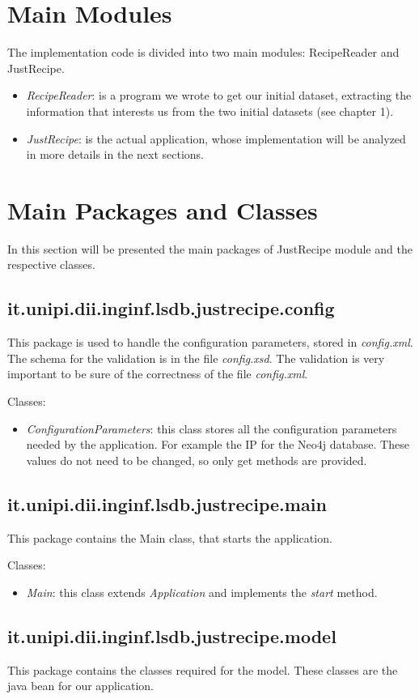 \documentclass[a4paper]{report}
\begin{document}
\section{Main Modules}
The implementation code is divided into two main modules: RecipeReader and JustRecipe.
 \begin{itemize}
	\item \emph{RecipeReader}:  is a program we wrote to get our initial dataset, extracting the information that interests us from the two initial datasets (see chapter 1). 
	\item \emph{JustRecipe}:  is the actual application, whose implementation will be analyzed in more details in the next sections. 
\end{itemize}
\section{Main Packages and Classes}
In this section will be presented the main packages of JustRecipe module and the respective classes.
\subsection {it.unipi.dii.inginf.lsdb.justrecipe.config}
This package is used to handle the configuration parameters, stored in \emph{config.xml}. The schema for the validation is in the file \emph{config.xsd}. The validation is very important to be sure of the correctness of the file \emph{config.xml}.

\noindent Classes:
 \begin{itemize}
	\item \emph{ConfigurationParameters}: this class stores all the configuration parameters needed by the application. For example the IP for the Neo4j database. These values do not need to be changed, so only get methods are provided. 
\end{itemize}
\subsection {it.unipi.dii.inginf.lsdb.justrecipe.main}
This package contains the Main class, that starts the application.

\noindent Classes:
 \begin{itemize}
	\item \emph{Main}: this class extends \emph{Application} and implements the \emph{start} method. 
\end{itemize}
\subsection{it.unipi.dii.inginf.lsdb.justrecipe.model}
This package contains the classes required for the model. These classes are the java bean for our application.
\end{document}
